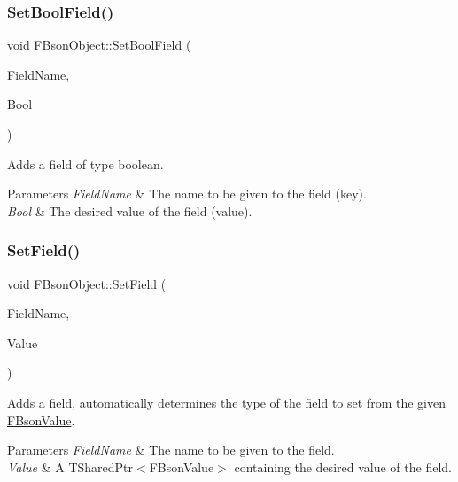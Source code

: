 \subsubsection{\texorpdfstring{Set\+Bool\+Field()}{SetBoolField()}}
{\footnotesize\ttfamily void F\+Bson\+Object\+::\+Set\+Bool\+Field (\begin{DoxyParamCaption}\item[{const F\+String \&}]{Field\+Name,  }\item[{bool}]{Bool }\end{DoxyParamCaption})}

Adds a field of type boolean.


\begin{DoxyParams}{Parameters}
{\em Field\+Name} & The name to be given to the field (key). \\
\hline
{\em Bool} & The desired value of the field (value). \\
\hline
\end{DoxyParams}
\mbox{\label{class_f_bson_object_a24d085f2040b805e4f1c5ad250646a5b}} 
\subsubsection{\texorpdfstring{Set\+Field()}{SetField()}}
{\footnotesize\ttfamily void F\+Bson\+Object\+::\+Set\+Field (\begin{DoxyParamCaption}\item[{const F\+String \&}]{Field\+Name,  }\item[{const T\+Shared\+Ptr$<$ \mbox{\hyperlink{class_f_bson_value}{F\+Bson\+Value}} $>$ \&}]{Value }\end{DoxyParamCaption})}

Adds a field, automatically determines the type of the field to set from the given \mbox{\hyperlink{class_f_bson_value}{F\+Bson\+Value}}.


\begin{DoxyParams}{Parameters}
{\em Field\+Name} & The name to be given to the field. \\
\hline
{\em Value} & A T\+Shared\+Ptr$<$\+F\+Bson\+Value$>$ containing the desired value of the field. \\
\hline
\end{DoxyParams}
\mbox{\label{class_f_bson_object_a0d1749707ef977f52c44eb9db029766f}} 
